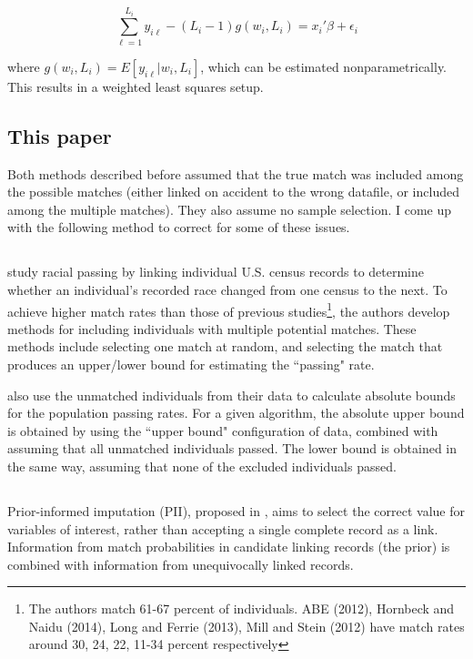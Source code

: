 \documentclass[12pt]{article}
\begin{document}
\begin{equation} 
\sum_{\ell=1}^{L_i} y_{i\ell} - (L_i - 1)g(w_i, L_i) = x_i'\beta + \epsilon_i \end{equation}

\noindent where $g(w_i, L_i) = E[y_{i\ell} | w_i, L_i ]$, which can be estimated nonparametrically.   This results in a weighted least squares setup.  

\subsection{This paper}
Both methods described before assumed that the true match was included among the possible matches (either linked on accident to the wrong datafile, or included among the multiple matches).  They also assume no sample selection. I come up with the following method to correct for some of these issues. 
\subsection{\cite{nq2015}}
\cite{nq2015} study racial passing by linking individual U.S. census records to determine whether an individual's recorded race changed from one census to the next.  To achieve higher match rates than those of previous studies\footnote{The authors match 61-67 percent of individuals.   ABE (2012), Hornbeck and Naidu (2014), Long and Ferrie (2013), Mill and Stein (2012)
have match rates around 30, 24, 22, 11-34 percent respectively}, the authors develop methods for including individuals with multiple potential matches.  These methods include selecting one match at random, and selecting the match that produces an upper/lower bound for estimating the ``passing" rate.  

\cite{nq2015} also use the unmatched individuals from their data to calculate absolute bounds for the population passing rates.  For a given algorithm, the absolute upper bound is obtained by using the ``upper bound" configuration of data, combined with assuming that all unmatched individuals passed.  The lower bound is obtained in the same way, assuming that none of the excluded individuals passed. 

\subsection{\cite{Goldstein2012}}


Prior-informed imputation (PII), proposed in \cite{Goldstein2012}, aims to select the
correct value for variables of interest, rather than accepting a single complete record as a link.  Information from match probabilities in candidate linking records (the prior) is combined with information
from unequivocally linked records.  
\end{document}
